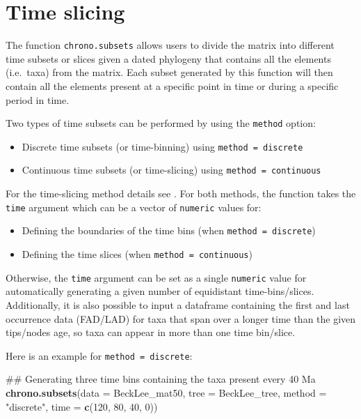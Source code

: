 \documentclass[]{book}
\newenvironment{Shaded}{\begin{snugshade}}{\end{snugshade}}
\newcommand{\KeywordTok}[1]{\textcolor[rgb]{0.13,0.29,0.53}{\textbf{#1}}}
\newcommand{\DataTypeTok}[1]{\textcolor[rgb]{0.13,0.29,0.53}{#1}}
\newcommand{\DecValTok}[1]{\textcolor[rgb]{0.00,0.00,0.81}{#1}}
\newcommand{\StringTok}[1]{\textcolor[rgb]{0.31,0.60,0.02}{#1}}
\newcommand{\NormalTok}[1]{#1}
\providecommand{\tightlist}{%
  \setlength{\itemsep}{0pt}\setlength{\parskip}{0pt}}
\theoremstyle{definition}
\theoremstyle{definition}
\theoremstyle{remark}
\begin{document}
\hypertarget{time-slicing}{\section{Time slicing}\label{time-slicing}}

The function \texttt{chrono.subsets} allows users to divide the matrix
into different time subsets or slices given a dated phylogeny that
contains all the elements (i.e.~taxa) from the matrix. Each subset
generated by this function will then contain all the elements present at
a specific point in time or during a specific period in time.

Two types of time subsets can be performed by using the \texttt{method}
option:

\begin{itemize}
\tightlist
\item
  Discrete time subsets (or time-binning) using
  \texttt{method\ =\ discrete}
\item
  Continuous time subsets (or time-slicing) using
  \texttt{method\ =\ continuous}
\end{itemize}

For the time-slicing method details see \citet{time-slice}. For both
methods, the function takes the \texttt{time} argument which can be a
vector of \texttt{numeric} values for:

\begin{itemize}
\tightlist
\item
  Defining the boundaries of the time bins (when
  \texttt{method\ =\ discrete})
\item
  Defining the time slices (when \texttt{method\ =\ continuous})
\end{itemize}

Otherwise, the \texttt{time} argument can be set as a single
\texttt{numeric} value for automatically generating a given number of
equidistant time-bins/slices. Additionally, it is also possible to input
a dataframe containing the first and last occurrence data (FAD/LAD) for
taxa that span over a longer time than the given tips/nodes age, so taxa
can appear in more than one time bin/slice.

Here is an example for \texttt{method\ =\ discrete}:

\begin{Shaded}
\begin{Highlighting}[]
\NormalTok{## Generating three time bins containing the taxa present every 40 Ma}
\KeywordTok{chrono.subsets}\NormalTok{(}\DataTypeTok{data =}\NormalTok{ BeckLee_mat50, }\DataTypeTok{tree =}\NormalTok{ BeckLee_tree, }\DataTypeTok{method =} \StringTok{"discrete"}\NormalTok{,}
                \DataTypeTok{time =} \KeywordTok{c}\NormalTok{(}\DecValTok{120}\NormalTok{, }\DecValTok{80}\NormalTok{, }\DecValTok{40}\NormalTok{, }\DecValTok{0}\NormalTok{))}
\end{Highlighting}
\end{Shaded}
\end{document}
